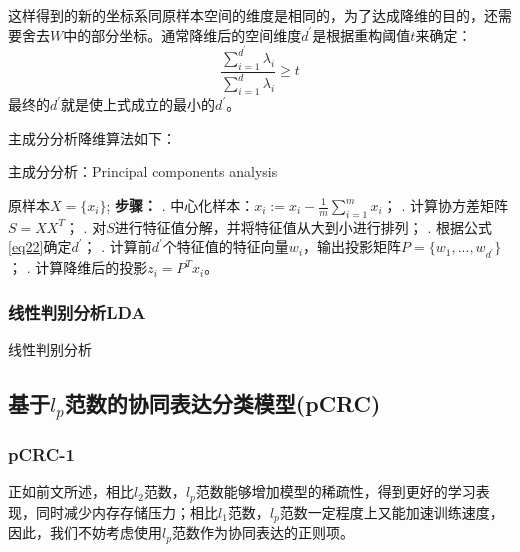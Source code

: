 \documentclass[12pt,a4paper]{article}
\begin{document}
这样得到的新的坐标系同原样本空间的维度是相同的，为了达成降维的目的，还需要舍去$W$中的部分坐标。通常降维后的空间维度$d^{'}$是根据重构阈值$t$来确定：
\begin{equation}
\label{eq22}
\frac{\sum_{i = 1}^{d^{'}} \lambda_{i}}{\sum_{i = 1}^{d} \lambda_{i}} \geq t
\end{equation}
最终的$d^{'}$就是使上式成立的最小的$d^{'}$。

主成分分析降维算法如下：
\begin{algorithm}[H] 
	\caption{主成分分析：Principal components analysis}  
	\label{alg:PCA}  
	\begin{algorithmic}
		\REQUIRE 
			原样本$X = \{x_{i}\}$;
		\STATE \textbf{步骤：}
		. 中心化样本：$x_{i} := x_{i} - \frac{1}{m}\sum_{i = 1}^{m}x_{i}$；   
		. 计算协方差矩阵$S = XX^{T}$；
		. 对$S$进行特征值分解，并将特征值从大到小进行排列；
		. 根据公式\eqref{eq22}确定$d^{'}$；
		. 计算前$d^{'}$个特征值的特征向量$w_{i}$，输出投影矩阵$P = \{w_{1}, ... , w_{d^{'}}\}$；
		. 计算降维后的投影$z_{i} = P^{T}x_{i}$。
	\end{algorithmic}  
\end{algorithm}  

\subsubsection{线性判别分析LDA}
线性判别分析

\subsection{基于$l_p$范数的协同表达分类模型(pCRC)}

\subsubsection{pCRC-1}
正如前文所述，相比$l_{2}$范数，$l_{p}$范数能够增加模型的稀疏性，得到更好的学习表现，同时减少内存存储压力；相比$l_{1}$范数，$l_{p}$范数一定程度上又能加速训练速度，因此，我们不妨考虑使用$l_{p}$范数作为协同表达的正则项。
\end{document}
